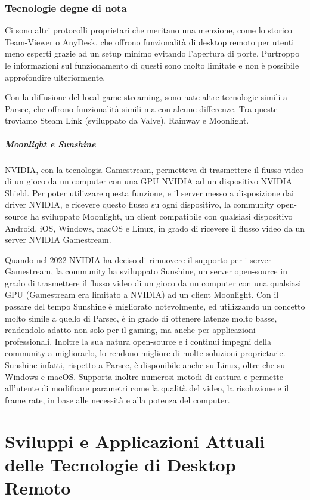 \documentclass[12pt,a4paper,openright,twoside]{book}
\begin{document}
\subsection{Tecnologie degne di nota}
Ci sono altri protocolli proprietari che meritano una menzione, come lo storico Team-Viewer o AnyDesk, che offrono funzionalità di desktop remoto per utenti meno esperti grazie ad un setup minimo evitando l'apertura di porte. Purtroppo le informazioni sul funzionamento di questi sono molto limitate e non è possibile approfondire ulteriormente.

Con la diffusione del local game streaming, sono nate altre tecnologie simili a Parsec, che offrono funzionalità simili ma con alcune differenze. Tra queste troviamo Steam Link (sviluppato da Valve), Rainway e Moonlight.

\paragraph{Moonlight e Sunshine}
NVIDIA, con la tecnologia Gamestream, permetteva di trasmettere il flusso video di un gioco da un computer con una GPU NVIDIA ad un dispositivo NVIDIA Shield. Per poter utilizzare questa funzione, e il server messo a disposizione dai driver NVIDIA, e ricevere questo flusso su ogni dispositivo, la community open-source ha sviluppato Moonlight, un client compatibile con qualsiasi dispositivo Android, iOS, Windows, macOS e Linux, in grado di ricevere il flusso video da un server NVIDIA Gamestream.

Quando nel 2022 NVIDIA ha deciso di rimuovere il supporto per i server Gamestream, la community ha sviluppato Sunshine, un server open-source in grado di trasmettere il flusso video di un gioco da un computer con una qualsiasi GPU (Gamestream era limitato a NVIDIA) ad un client Moonlight.
Con il passare del tempo Sunshine è migliorato notevolmente, ed utilizzando un concetto molto simile a quello di Parsec, è in grado di ottenere latenze molto basse, rendendolo adatto non solo per il gaming, ma anche per applicazioni professionali. Inoltre la sua natura open-source e i continui impegni della community a migliorarlo, lo rendono migliore di molte soluzioni proprietarie. Sunshine infatti, rispetto a Parsec, è disponibile anche su Linux, oltre che su Windows e macOS. Supporta inoltre numerosi metodi di cattura e permette all'utente di modificare parametri come la qualità del video, la risoluzione e il frame rate, in base alle necessità e alla potenza del computer.

\chapter{Sviluppi e Applicazioni Attuali delle Tecnologie di Desktop Remoto}
\label{chap:current-applications}
\end{document}
